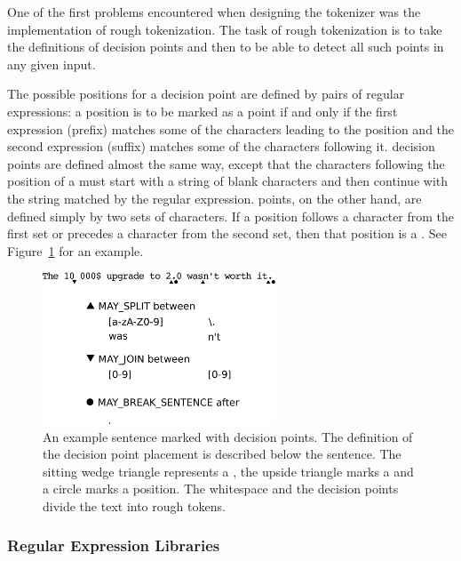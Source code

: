 One of the first problems encountered when designing the tokenizer was the
implementation of rough tokenization. The task of rough tokenization is to take
the definitions of decision points and then to be able to detect all such points
in any given input.

The possible positions for a \maysplit{} decision point are defined by pairs of
regular expressions: a position is to be marked as a \maysplit{} point if and
only if the first expression (prefix) matches some of the characters
leading to the position and the second expression (suffix) matches some of
the characters following it. \mayjoin{} decision points are defined almost the
same way, except that the characters following the position of a \mayjoin{}
must start with a string of blank characters and then continue with the string
matched by the regular expression. \maybreaksentence{} points, on the other
hand, are defined simply by two sets of characters. If a position follows a
character from the first set or precedes a character from the second set, then
that position is a \maybreaksentence{}. See Figure~\ref{fig:decision-points} for an example.

\begin{figure}
  \includegraphics[width=0.618033988\textwidth]{img/decisionpoints.eps}
  \caption{An example sentence marked with decision points. The definition of
           the decision point placement is described below the sentence. The
           sitting wedge triangle represents a \maysplit{}, the upside triangle
           marks a \mayjoin{} and a circle marks a \maybreaksentence{}
           position. The whitespace and the decision points divide the text
           into rough tokens.}
  \label{fig:decision-points}
\end{figure}


\subsubsection{Regular Expression Libraries}
\label{ssec:impl-roughtok-regex}

